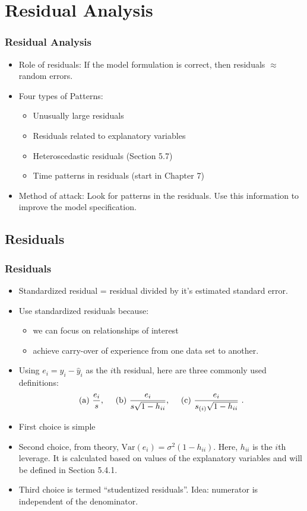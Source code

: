 \section{Residual Analysis}

\begin{frame}%
 \frametitle{Residual Analysis}
 \begin{itemize}
   \item Role of residuals:  If the model formulation is correct, then residuals $\approx$ random errors.
 \item Four types of Patterns:
\begin{itemize}
   \item Unusually large residuals
   \item Residuals related to explanatory variables
\item Heteroscedastic residuals (Section 5.7)
\item Time patterns in residuals (start in Chapter 7)
\end{itemize}
\item Method of attack: Look for patterns in the residuals. Use this information to improve
the model specification.
    \end{itemize}
\end{frame}



\subsection{Residuals}

\begin{frame}%
 \frametitle{Residuals}
 \begin{itemize}
   \item Standardized residual = residual divided by it's estimated standard error.
\item Use standardized residuals because:
 \begin{itemize}
   \item we can focus on relationships of interest
\item achieve carry-over of experience from one data set to another.
\end{itemize}
\item Using $e_i = y_{i}-\hat{y}_{i}$ as the $i$th residual, here are
three commonly used definitions:
\begin{equation*}
\text{(a) }\frac{e_i}{s},\text{ \ \ \ (b) }\frac{e_i}{s\sqrt{%
1-h_{ii}}}, \text { \  \   \   }\text{(c)
}\frac{e_i}{s_{(i)}\sqrt{1-h_{ii}}}\text{\ }.
\end{equation*}
\item First choice is simple
\item Second choice, from theory,  $\mathrm{Var}(e_i)=\sigma ^{2}(1-h_{ii}).$
Here, $h_{ii}$ is the $i$th leverage. It is calculated based on
values of the explanatory variables and will be defined in Section
5.4.1.
\item Third choice is termed ``studentized residuals''. Idea: numerator is
independent of the denominator.
    \end{itemize}
\end{frame}

